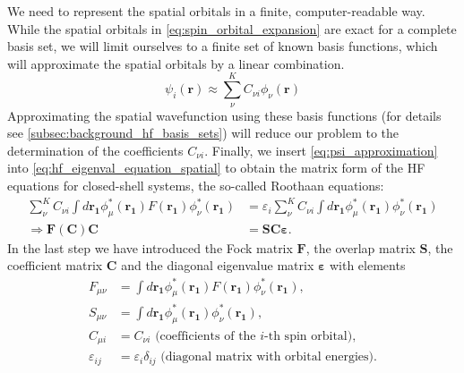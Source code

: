 We need to represent the spatial orbitals in a finite, computer-readable way. While the spatial orbitals in \autoref{eq:spin_orbital_expansion} are exact for a complete basis set, we will limit ourselves to a finite set of known basis functions, which will approximate the spatial orbitals by a linear combination.
\begin{equation}
    \label{eq:psi_approximation}
    \psi_i(\mathbf{r}) \approx \sum_{\nu}^{K} C_{\nu i} \phi_\nu(\mathbf{r})
\end{equation}
Approximating the spatial wavefunction using these basis functions (for details see \autoref{subsec:background_hf_basis_sets}) will reduce our problem to the determination of the coefficients $C_{\nu i}$. Finally, we insert \autoref{eq:psi_approximation} into \autoref{eq:hf_eigenval_equation_spatial} to obtain the matrix form of the HF equations for closed-shell systems, the so-called Roothaan equations:
\begin{subequations}
    \label{eq:roothaan_equations}
    \begin{align}
        \sum_{\nu}^{K} C_{\nu i} \int d\mathbf{r_1} \phi_\mu^*(\mathbf{r_1}) F(\mathbf{r_1}) \phi_\nu^*(\mathbf{r_1})&= \varepsilon_i \sum_{\nu}^{K} C_{\nu i} \int d\mathbf{r_1} \phi_\mu^*(\mathbf{r_1})\phi_\nu^*(\mathbf{r_1}) \\
        \Rightarrow \mathbf{F(C)C} &= \mathbf{SC} \boldsymbol{\varepsilon}. \label{eq:roothaan_equations_matrix}
    \end{align}
\end{subequations}
In the last step we have introduced the Fock matrix $\mathbf{F}$, the overlap matrix $\mathbf{S}$, the coefficient matrix $\mathbf{C}$ and the diagonal eigenvalue matrix $\boldsymbol{\varepsilon}$ with elements
\begin{subequations}
    \label{eq:roothaan_matrices}
    \begin{align}
        F_{\mu \nu} &= \int d\mathbf{r_1} \phi_\mu^*(\mathbf{r_1}) F(\mathbf{r_1}) \phi_\nu^*(\mathbf{r_1}), \label{eq:roothaan_mat_F}\\
        S_{\mu \nu} &= \int d\mathbf{r_1} \phi_\mu^*(\mathbf{r_1}) \phi_\nu^*(\mathbf{r_1}), \\
        C_{\mu i} &= C_{\nu i} \text{ (coefficients of the } i\text{-th spin orbital)},\\
        \varepsilon_{ij} &= \varepsilon_i \delta_{ij} \text{ (diagonal matrix with orbital energies)}.
    \end{align}
\end{subequations}
